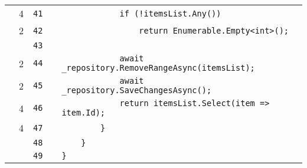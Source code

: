 \documentclass[a4paper,landscape,10pt]{article}
\begin{document}
\begin{longtable}[l]{lrrll}
\cellcolor{green} & 4 & \verb~41~ & & \verb~            if (!itemsList.Any())~\\
\cellcolor{green} & 2 & \verb~42~ & & \verb~                return Enumerable.Empty<int>();~\\
\cellcolor{gray} &  & \verb~43~ & & \verb~~\\
\cellcolor{green} & 2 & \verb~44~ & & \verb~            await _repository.RemoveRangeAsync(itemsList);~\\
\cellcolor{green} & 2 & \verb~45~ & & \verb~            await _repository.SaveChangesAsync();~\\
\cellcolor{green} & 4 & \verb~46~ & & \verb~            return itemsList.Select(item => item.Id);~\\
\cellcolor{green} & 4 & \verb~47~ & & \verb~        }~\\
\cellcolor{gray} &  & \verb~48~ & & \verb~    }~\\
\cellcolor{gray} &  & \verb~49~ & & \verb~}~\\
\end{longtable}
\end{document}
